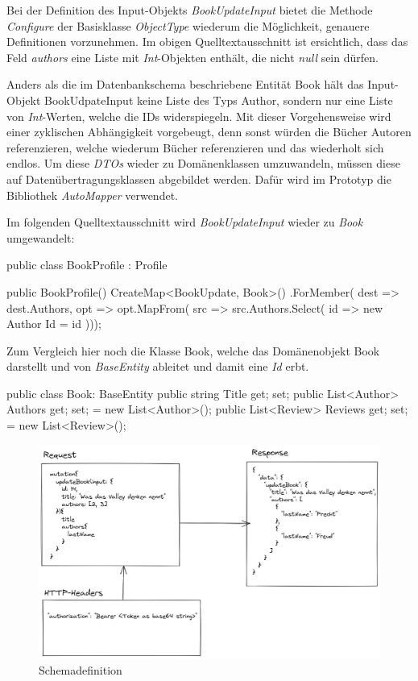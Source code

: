 Bei der Definition des Input-Objekts \textit{BookUpdateInput} bietet die Methode \textit{Configure} der Basisklasse \textit{ObjectType} wiederum die Möglichkeit, genauere Definitionen vorzunehmen.
Im obigen Quelltextausschnitt ist ersichtlich, dass das Feld \textit{authors} eine Liste mit \textit{Int}-Objekten enthält, die nicht \textit{null} sein dürfen.
\newline

Anders als die im Datenbankschema beschriebene Entität Book hält das Input-Objekt BookUdpateInput keine Liste des Typs Author, sondern nur eine Liste von \textit{Int}-Werten, welche die IDs widerspiegeln.
Mit dieser Vorgehensweise wird einer zyklischen Abhängigkeit vorgebeugt, denn sonst würden die Bücher Autoren referenzieren, welche wiederum Bücher referenzieren und das wiederholt sich endlos.
Um diese \textit{DTOs} wieder zu Domänenklassen umzuwandeln, müssen diese auf Datenübertragungsklassen abgebildet werden.
Dafür wird im Prototyp die Bibliothek \textit{AutoMapper} verwendet.

Im folgenden Quelltextausschnitt wird \textit{BookUpdateInput} wieder zu \textit{Book} umgewandelt:
\begin{JsCode}
public class BookProfile : Profile {
    public BookProfile() {
        CreateMap<BookUpdate, Book>()
            .ForMember(
            dest => dest.Authors,
            opt => opt.MapFrom(
                    src => src.Authors.Select(
                        id => new Author { Id = id })));
    }

}
\end{JsCode}

Zum Vergleich hier noch die Klasse Book, welche das Domänenobjekt Book darstellt und von \textit{BaseEntity} ableitet und damit eine \textit{Id} erbt.

\begin{JsCode}
public class Book: BaseEntity {
    public string Title { get; set; }
    public List<Author> Authors { get; set; } = new List<Author>();
    public List<Review> Reviews { get; set; } = new List<Review>();
}
\end{JsCode}
\pagebreak
{}

\begin{figure}[H]
    \includegraphics[width=\textwidth]{pics/execution_mutation.png}
    \caption{Schemadefinition}
\end{figure}

